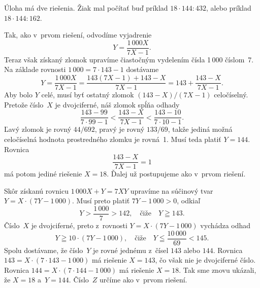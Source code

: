 {\odpoved
Úloha má dve riešenia. Žiak mal počítať buď príklad
$18\cdot144:432$, alebo príklad $18\cdot144:162$.

\ineriesenie
Tak, ako v~prvom riešení, odvodíme vyjadrenie
$$
Y=\frac{1\,000X}{7X-1}.
$$
Teraz však získaný zlomok upravíme čiastočným vydelením čísla
1\,000 číslom~7. Na základe rovnosti
$1\,000=7\cdot143-1$ dostávame
$$
Y=\frac{1\,000X}{7X-1}=\frac{143(7X-1)+143-X}{7X-1}=143+
\frac{143-X}{7X-1}.
$$
Aby bolo $Y$ celé, musí byť ostatný zlomok $(143-X)/(7X-1)$
celočíselný. Pretože číslo~$X$ je dvojciferné, náš zlomok
spĺňa odhady
$$
\frac{143-99}{7\cdot99-1}<\frac{143-X}{7X-1}<
\frac{143-10}{7\cdot10-1}.
$$
Ľavý zlomok je rovný $44/692$, pravý je rovný $133/69$, takže
jediná možná celočíselná hodnota prostredného zlomku je rovná~1.
Musí teda platiť $Y=144$. Rovnica
$$
\frac{143-X}{7X-1}=1
$$
má potom jediné riešenie $X=18$. Ďalej už postupujeme ako v~prvom
riešení.

\ineriesenie
Skôr získanú rovnicu $1\,000X+Y=7XY$
upravíme na súčinový tvar $Y=X\cdot(7Y-1\,000)$. Musí preto
platiť $7Y-1\,000>0$, odkiaľ
$$
Y>\frac{1\,000}{7}>142,\quad\text{čiže}\quad
Y\geqq143.
$$
Číslo~$X$ je dvojciferné, preto z~rovnosti $Y=X\cdot(7Y-1\,000)$
vychádza odhad
$$
Y\geqq10\cdot(7Y-1\,000),\quad\text{čiže}\quad
Y\leqq\frac{10\,000}{69}<145.
$$
Spolu dostávame, že číslo~$Y$ je rovné jednému z~čísel $143$
alebo $144$. Rovnica $143=X\cdot(7\cdot143-1\,000)$ má riešenie
$X=143$, čo však nie je dvojciferné číslo. Rovnica
$144=X\cdot(7\cdot144-1\,000)$ má riešenie $X=18$. Tak sme znovu
ukázali, že $X=18$ a~$Y=144$. Číslo~$Z$ určíme ako v~prvom
riešení.}

